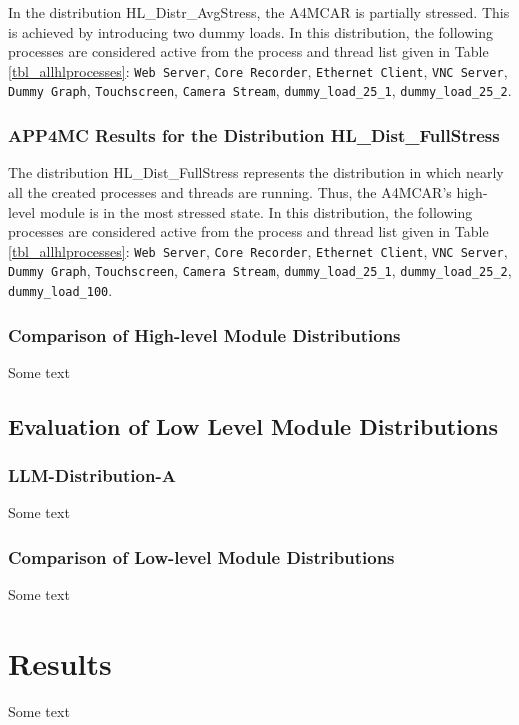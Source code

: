In the distribution HL{\_}Distr{\_}AvgStress, the A4MCAR is partially stressed. This is achieved by introducing two dummy loads. In this distribution, the following processes are considered active from the process and thread list given in Table \ref{tbl_allhlprocesses}: \texttt{Web Server}, \texttt{Core Recorder}, \texttt{Ethernet Client}, \texttt{VNC Server}, \texttt{Dummy Graph}, \texttt{Touchscreen}, \texttt{Camera Stream}, \texttt{dummy{\_}load{\_}25{\_}1}, \texttt{dummy{\_}load{\_}25{\_}2}.


\subsubsection{APP4MC Results for the Distribution HL{\_}Dist{\_}FullStress}

The distribution HL{\_}Dist{\_}FullStress represents the distribution in which nearly all the created processes and threads are running. Thus, the A4MCAR's high-level module is in the most stressed state. In this distribution, the following processes are considered active from the process and thread list given in Table \ref{tbl_allhlprocesses}: \texttt{Web Server}, \texttt{Core Recorder}, \texttt{Ethernet Client}, \texttt{VNC Server}, \texttt{Dummy Graph}, \texttt{Touchscreen}, \texttt{Camera Stream}, \texttt{dummy{\_}load{\_}25{\_}1}, \texttt{dummy{\_}load{\_}25{\_}2}, \texttt{dummy{\_}load{\_}100}.



\subsubsection{Comparison of High-level Module Distributions}
Some text
\hlcomparison

\subsection{Evaluation of Low Level Module Distributions}
\subsubsection{LLM-Distribution-A}
Some text
\llmdistrA

\subsubsection{Comparison of Low-level Module Distributions}
Some text
\llcomparison

\section{Results}
Some text \\

